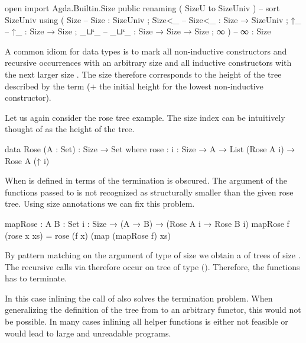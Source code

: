 \begin{code}[hide]
open import Agda.Builtin.Size public
  renaming ( SizeU to SizeUniv )  --  sort SizeUniv
  using    ( Size                 --  Size   : SizeUniv
           ; Size<_               --  Size<_ : Size → SizeUniv
           ; ↑_                   --  ↑_     : Size → Size
           ; _⊔ˢ_                 --  _⊔ˢ_   : Size → Size → Size
           ; ∞ )                  --  ∞      : Size
\end{code}

A common idiom for data types is to mark all non-inductive constructors and
recursive occurrences with an arbitrary size  and all inductive
constructors with the next larger size
\AgdaSpace{}.
The size therefore corresponds to the height of the tree described by the term
($+$ the initial height for the lowest non-inductive constructor).

Let us again consider the rose tree example.
The size index can be intuitively thought of as the height of the tree.

\begin{code}
data Rose (A : Set) : Size → Set where 
  rose : {i : Size} → A → List (Rose A i) → Rose A (↑ i)
\end{code}
When  is defined in terms of
 the termination is obscured.
The argument of the functions passed to  is not recognized as
structurally smaller than the given rose tree.
Using size annotations we can fix this problem.

\begin{code}
mapRose : {A B : Set} {i : Size} → (A → B) → (Rose A i → Rose B i)
mapRose f (rose x xs) = rose (f x) (map (mapRose f) xs)
\end{code}
By pattern matching on the argument of type
\AgdaSpace{} of size
\AgdaSpace{} we obtain a  of
trees of size .
The recursive calls via  therefore occur on tree of type 
\AgdaSpace{}\AgdaSpace{}$($\AgdaSpace{}$)$.
Therefore, the functions has to terminate.

In this case inlining the call of  also solves the termination
problem.
When generalizing the definition of the tree from  to an
arbitrary functor, this would not be possible.
In many cases inlining all helper functions is either not feasible or would lead
to large and unreadable programs.


